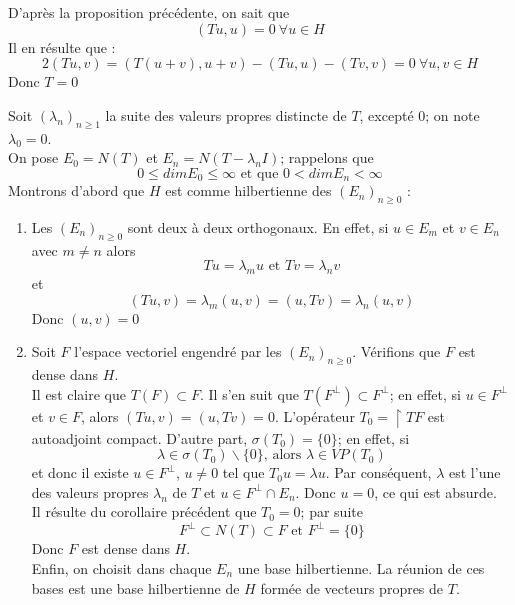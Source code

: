 \begin{dem}
	D'après la proposition précédente, on sait que \[(Tu,u)=0\ \forall u\in H\]
Il en résulte que :
	\[2(Tu,v)=(T(u+v),u+v)-(Tu,u)-(Tv,v)=0\ \forall u,v\in H\]
Donc $T=0$
\end{dem}


\begin{dem}
Soit $(\lambda_n)_{n\geq 1}$ la suite des valeurs propres distincte de $T$, excepté $0$; on note $\lambda_0=0$.\\
On pose $E_0=N(T)$ et $E_n=N(T-\lambda_n I)$; rappelons que \[0\leq dim E_0\leq \infty \text{ et que } 0<dim E_n<\infty\]
Montrons d'abord que $H$ est comme hilbertienne des $(E_n)_{n\geq 0}$ :
\begin{enumerate}
	\item Les $(E_n)_{n\geq 0}$ sont deux à deux orthogonaux. En effet, si $u\in E_{m}$ et $v\in E_n$ avec $m\neq n$ alors 
	\[Tu=\lambda_mu \text{ et } Tv=\lambda_n v\]
et \[(Tu,v)=\lambda_m(u,v)=(u,Tv)=\lambda_n(u,v)\]
Donc $(u,v)=0$

	\item Soit $F$ l'espace vectoriel engendré par les $(E_n)_{n\geq 0}$. Vérifions que $F$ est dense dans $H$.\\
Il est claire que $T(F)\subset F$. Il s'en suit que $T(F^\perp)\subset F^\perp$; en effet, si $u\in F^\perp$ et $v\in F$, alors $(Tu,v)=(u,Tv)=0$. L'opérateur $T_0=\restriction{T}{F}$ est autoadjoint compact. D'autre part, $\sigma(T_0)=\{0\}$; en effet, si
	\[\lambda\in\sigma(T_0)\backslash\{0\}\text{, alors } \lambda\in VP(T_0)\]
et donc il existe $u\in F^\perp$, $u\neq 0$ tel que $T_0u=\lambda u$. Par conséquent, $\lambda$ est l'une des valeurs propres $\lambda_n$ de $T$ et $u\in F^\perp\cap E_n$. Donc $u=0$, ce qui est absurde.\\
Il résulte du corollaire précédent que $T_0=0$; par suite
	\[F^\perp\subset N(T)\subset F \text{ et } F^\perp=\{0\}\]
Donc $F$ est dense dans $H$.\\
Enfin, on choisit dans chaque $E_n$ une base hilbertienne. La réunion de ces bases est une base hilbertienne de $H$ formée de vecteurs propres de $T$.
\end{enumerate}
\end{dem}

